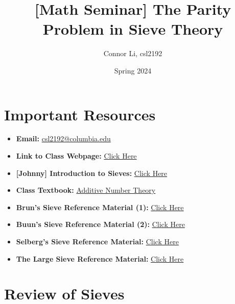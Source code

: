 \documentclass[10pt]{extarticle}
\title{[Math Seminar] The Parity Problem in Sieve Theory}
\author{Connor Li, csl2192}
\date{Spring 2024}
\begin{document}
\maketitle

\section*{Important Resources}
\begin{itemize}
    \item \textbf{Email:} \href{mailto:csl2192@columbia.edu}{csl2192@columbia.edu}
    \item \textbf{Link to Class Webpage:} \href{https://www.math.columbia.edu/~avizeff/additive/index.html}{Click Here}
    \item \textbf{[Johnny] Introduction to Sieves:} \href{https://www.math.columbia.edu/~avizeff/additive/talk_10.pdf}{Click Here}
    \item \textbf{Class Textbook:} \href{http://www.alefenu.com/libri/nathansonbases.pdf}{Additive Number Theory}
    \item \textbf{Brun's Sieve Reference Material (1):} \href{https://www.math.columbia.edu/~avizeff/additive/talk_12.pdf}{Click Here}
    \item \textbf{Buun's Sieve Reference Material (2):} \href{https://www.math.columbia.edu/~avizeff/additive/talk_13.pdf}{Click Here}
    \item \textbf{Selberg's Sieve Reference Material:} \href{https://www.math.columbia.edu/~avizeff/additive/talk_14.pdf}{Click Here}
    \item \textbf{The Large Sieve Reference Material:} \href{https://columbiauniversity.zoom.us/rec/play/rxd23-9BFy8ZeuEKEmh7rsgU_MFA4J9SygcsxBNFDDySy4bUon6aie6KVECuYWQ1w4XldraaB7LqCxU0.FPuBLFNwvPNu3GKA?autoplay=true&startTime=1712158850000}{Click Here}
\end{itemize}

\tableofcontents   


\pagebreak
\section{Review of Sieves}
\end{document}
